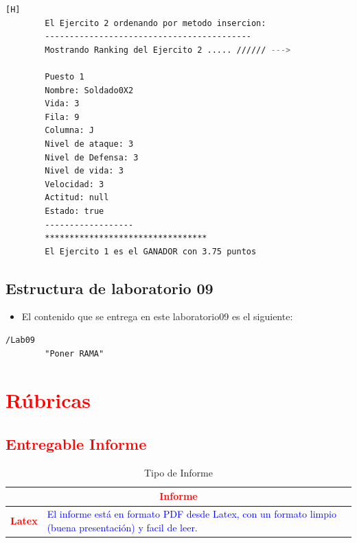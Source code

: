 \documentclass{article}
\begin{document}
\begin{lstlisting}[language=bash,caption={Ejecucion:}][H]
		El Ejercito 2 ordenando por metodo insercion: 
		------------------------------------------
		Mostrando Ranking del Ejercito 2 ..... ////// --->

		Puesto 1
		Nombre: Soldado0X2
		Vida: 3
		Fila: 9
		Columna: J
		Nivel de ataque: 3
		Nivel de Defensa: 3
		Nivel de vida: 3
		Velocidad: 3
		Actitud: null
		Estado: true
		------------------
		*********************************
		El Ejercito 1 es el GANADOR con 3.75 puntos

	\end{lstlisting}
	
	\subsection{Estructura de laboratorio 09}
	\begin{itemize}	
		\item El contenido que se entrega en este laboratorio09 es el siguiente:
	\end{itemize}
	\begin{lstlisting}[style=ascii-tree]
	/Lab09	
		"Poner RAMA"

	\end{lstlisting}    
	\section{\textcolor{red}{Rúbricas}}
	
	\subsection{\textcolor{red}{Entregable Informe}}
	\begin{table}[H]
		\caption{Tipo de Informe}
		\setlength{\tabcolsep}{0.5em} %
		{\renewcommand{\arraystretch}{1.5}%
		\begin{tabular}{|p{3cm}|p{12cm}|}
			\hline
			\multicolumn{2}{|c|}{\textbf{\textcolor{red}{Informe}}}  \\
			\hline 
			\textbf{\textcolor{red}{Latex}} & \textcolor{blue}{El informe está en formato PDF desde Latex,  con un formato limpio (buena presentación) y facil de leer.}   \\ 
			\hline 
			
			
		\end{tabular}
	}
	\end{table}
	
	\clearpage
	
\end{document}
